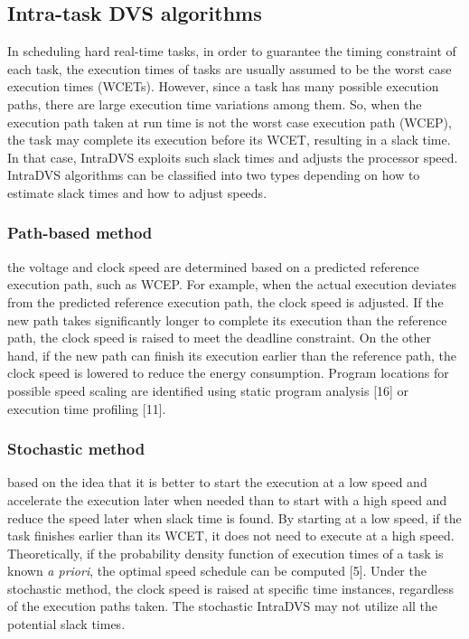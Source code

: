 \documentclass[10pt,article]{IEEEtran}
\begin{document}
\subsection{Intra-task DVS algorithms} 
In  scheduling hard real-time tasks, in order to guarantee the timing constraint of each task,  the execution times of tasks are usually assumed to be the worst case execution times (WCETs).  However, since a task has many possible execution paths, there are large execution time variations among them. So, when the execution path taken at run time is not the worst case execution path (WCEP), the task may complete its execution before its WCET, resulting in a slack time. In that case, IntraDVS exploits such slack times and adjusts the processor speed. IntraDVS algorithms can be classified into two types depending on how to estimate slack times and how to adjust speeds.

\subsubsection{Path-based method} the voltage and clock speed are determined based on a predicted reference execution path, such as WCEP. For example, when the actual execution deviates from the predicted reference execution path, the clock speed is adjusted.  If the new path takes significantly longer to complete its execution than the reference path, the clock speed is raised to meet the deadline constraint. On the other hand, if the new path can finish its execution earlier than the reference path, the clock speed is lowered to reduce the energy consumption. Program locations for possible speed scaling are identified using static program analysis [16] or execution time profiling [11].


\subsubsection{Stochastic method}
based on the idea that it is better to start the execution at a low speed and accelerate the execution later when needed than to start with a high speed and reduce the speed later when slack time is found. By starting at a low speed, if the task finishes earlier than its WCET, it does not need to execute at a high speed. Theoretically, if the probability density function of execution times of a task is known \emph{a priori}, the optimal speed schedule can be computed [5].  Under the stochastic method, the clock speed is raised at specific time instances, regardless of the execution paths taken. The stochastic IntraDVS may not utilize all the potential slack times.
\end{document}
